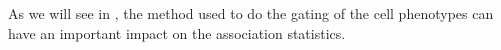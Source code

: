 As we will see in , the method used to do the gating of the cell phenotypes can have an important impact on the association
statistics.

%
%
%
%
%





